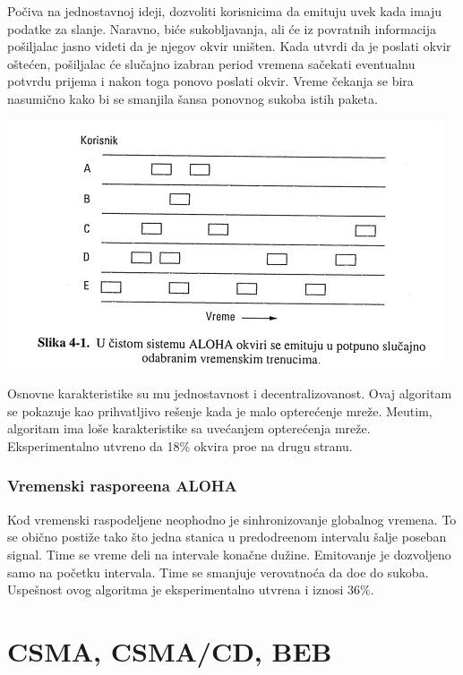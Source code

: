 \documentclass{article} %
\begin{document}
Po\v{c}iva na jednostavnoj ideji, dozvoliti korisnicima da emituju uvek kada imaju podatke za slanje. Naravno, bi\'{c}e sukobljavanja, ali \'{c}e iz povratnih informacija po\v{s}iljalac jasno videti da je njegov okvir uni\v{s}ten. Kada utvrdi da je poslati okvir o\v{s}te\'{c}en, po\v{s}iljalac \'{c}e slu\v{c}ajno izabran period vremena sa\v{c}ekati eventualnu potvrdu prijema i nakon toga ponovo poslati okvir. Vreme \v{c}ekanja se bira nasumi\v{c}no kako bi se smanjila \v{s}ansa ponovnog sukoba istih paketa.

\begin{center}
	\includegraphics[scale=0.5]{aloha}
\end{center}

Osnovne karakteristike su mu jednostavnost i decentralizovanost. Ovaj algoritam se pokazuje kao prihvatljivo re\v{s}enje kada je malo optere\'{c}enje mre\v{z}e. Me\dj{}utim, algoritam ima lo\v{s}e karakteristike sa uve\'{c}anjem optere\'{c}enja mre\v{z}e. Eksperimentalno utvr\dj{}eno da 18\% okvira pro\dj{}e na drugu stranu.

\subsubsection{Vremenski raspore\dj{}ena ALOHA}

Kod vremenski raspodeljene neophodno je sinhronizovanje globalnog vremena. To se obi\v{c}no posti\v{z}e tako \v{s}to jedna stanica u predodre\dj{}enom intervalu \v{s}alje poseban signal. Time se vreme deli na intervale kona\v{c}ne du\v{z}ine. Emitovanje je dozvoljeno samo na po\v{c}etku intervala. Time se smanjuje verovatno\'{c}a da do\dj{}e do sukoba. Uspe\v{s}nost ovog algoritma je eksperimentalno utvr\dj{}ena i iznosi 36\%.

\section{CSMA, CSMA/CD, BEB}
\end{document}
